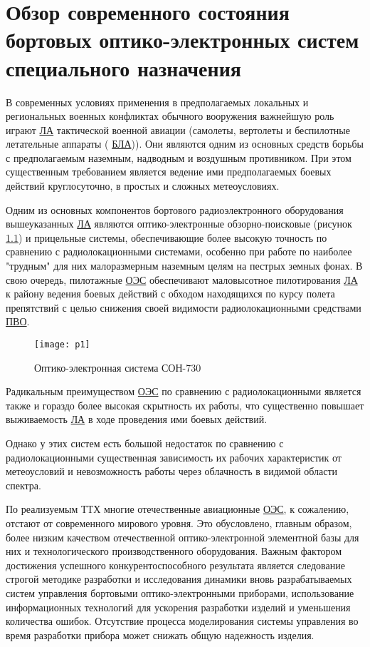 \chapter{Обзор современного состояния бортовых оптико-электронных систем специального назначения} \label{ch:ch1}

В современных условиях применения в предполагаемых локальных и региональных военных конфликтах обычного вооружения важнейшую роль играют  \hyperref[acroLA]{ЛА} тактической военной авиации (самолеты, вертолеты и беспилотные летательные аппараты ( \hyperref[acroUAV]{БЛА})). Они являются одним из основных средств борьбы с предполагаемым наземным, надводным и воздушным противником. При этом существенным требованием является ведение ими предполагаемых боевых действий круглосуточно, в простых и сложных метеоусловиях. 

Одним из основных компонентов бортового радиоэлектронного оборудования вышеуказанных  \hyperref[acroLA]{ЛА} являются оптико-электронные обзорно-поисковые 
(рисунок \ref{fig:soep}) и прицельные системы, обеспечивающие более высокую точность по сравнению с радиолокационными системами, особенно при работе по наиболее "трудным" для них малоразмерным наземным целям на пестрых земных фонах. В свою очередь, пилотажные \hyperref[acroEOS]{ОЭС} обеспечивают маловысотное пилотирования \hyperref[acroLA]{ЛА} к району ведения боевых действий с обходом находящихся по курсу полета препятствий с целью снижения своей видимости радиолокационными средствами  \hyperref[acroPVO]{ПВО}.

\begin{figure}[ht]
	\centering
 \texttt{[image: p1]} 
 \caption{Оптико-электронная система СОН-730}
 \label{fig:soep}
\end{figure}

Радикальным преимуществом \hyperref[acroEOS]{ОЭС} по сравнению с радиолокационными является также и гораздо более высокая скрытность их работы, что существенно повышает выживаемость  \hyperref[acroLA]{ЛА} в ходе проведения ими боевых действий. 

Однако у этих систем есть большой недостаток по сравнению с радиолокационными существенная зависимость их рабочих характеристик от метеоусловий и невозможность работы через облачность в видимой области спектра. 

По реализуемым ТТХ многие отечественные авиационные  \hyperref[acroEOS]{ОЭС}, к сожалению, отстают от современного мирового уровня. Это обусловлено, главным образом, более низким качеством отечественной оптико-электронной элементной базы для них и технологического производственного оборудования. Важным фактором достижения успешного конкурентоспособного результата является следование строгой методике разработки и исследования динамики вновь разрабатываемых систем управления бортовыми оптико-электронными приборами, использование информационных технологий для ускорения разработки изделий и уменьшения количества ошибок. Отсутствие процесса моделирования системы управления во время разработки прибора может снижать общую надежность изделия.

